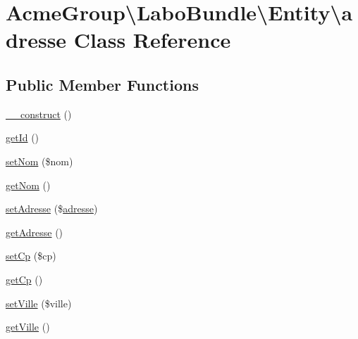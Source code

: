 \hypertarget{class_acme_group_1_1_labo_bundle_1_1_entity_1_1adresse}{\section{Acme\+Group\textbackslash{}Labo\+Bundle\textbackslash{}Entity\textbackslash{}adresse Class Reference}
\label{class_acme_group_1_1_labo_bundle_1_1_entity_1_1adresse}
}
\subsection*{Public Member Functions}
\begin{DoxyCompactItemize}
\item 
\hyperlink{class_acme_group_1_1_labo_bundle_1_1_entity_1_1adresse_a315e81c019ac69814acc37e46d31fe82}{\+\_\+\+\_\+construct} ()
\item 
\hyperlink{class_acme_group_1_1_labo_bundle_1_1_entity_1_1adresse_a41623295bbd9815d816979d4fbcc2570}{get\+Id} ()
\item 
\hyperlink{class_acme_group_1_1_labo_bundle_1_1_entity_1_1adresse_a9ec763e39cdb5476cfaca4aa68f72b4b}{set\+Nom} (\$nom)
\item 
\hyperlink{class_acme_group_1_1_labo_bundle_1_1_entity_1_1adresse_a3261d412d1a6eeec5bb68ae16980941d}{get\+Nom} ()
\item 
\hyperlink{class_acme_group_1_1_labo_bundle_1_1_entity_1_1adresse_a987ae0a418f3736f0576387fcd037d1c}{set\+Adresse} (\$\hyperlink{class_acme_group_1_1_labo_bundle_1_1_entity_1_1adresse}{adresse})
\item 
\hyperlink{class_acme_group_1_1_labo_bundle_1_1_entity_1_1adresse_a0e8e4f2923b85915c975c7d3eae459d0}{get\+Adresse} ()
\item 
\hyperlink{class_acme_group_1_1_labo_bundle_1_1_entity_1_1adresse_acf2037597e38c3ccc5504822495822bb}{set\+Cp} (\$cp)
\item 
\hyperlink{class_acme_group_1_1_labo_bundle_1_1_entity_1_1adresse_aa128baaaa20cfd26716cb08fd1dda1e2}{get\+Cp} ()
\item 
\hyperlink{class_acme_group_1_1_labo_bundle_1_1_entity_1_1adresse_a932fce162276f3807d7458ce65649f97}{set\+Ville} (\$ville)
\item 
\hyperlink{class_acme_group_1_1_labo_bundle_1_1_entity_1_1adresse_af3b063c6dadcc458967f5da7fe4c7c00}{get\+Ville} ()
\item 

\end{DoxyCompactItemize}
